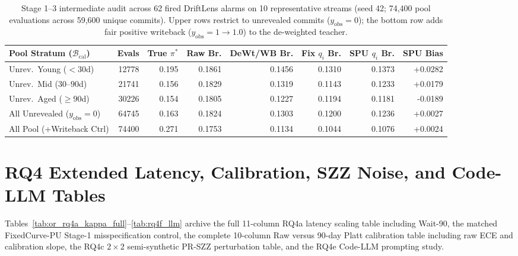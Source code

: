 \documentclass[10pt,a4paper]{article}
\begin{document}
\begin{table}[!htbp]
\centering
\caption{Stage 1--3 intermediate audit across 62 fired DriftLens alarms on 10 representative streams (seed 42; 74,400 pool evaluations across 59,600 unique commits). Upper rows restrict to unrevealed commits ($y_{\mathrm{obs}}=0$); the bottom row adds fair positive writeback ($y_{\mathrm{obs}}=1 \to 1.0$) to the de-weighted teacher.}
\label{tab:mechanism_audit}
\fontsize{7.5}{9.0}\selectfont
\setlength{\tabcolsep}{2.0pt}
\begin{tabular*}{\textwidth}{@{\extracolsep\fill}lrrrrrrr@{}}
\toprule
\textbf{Pool Stratum ($\mathcal{B}_{\mathrm{cal}}$)} & \textbf{Evals} & \textbf{True $\pi^*$} & \textbf{Raw Br.} & \textbf{DeWt/WB Br.} & \textbf{Fix $q_i$ Br.} & \textbf{SPU $q_i$ Br.} & \textbf{SPU Bias} \\
\midrule
Unrev.\ Young ($<30$d) & 12778 & 0.195 & 0.1861 & 0.1456 & 0.1310 & 0.1373 & +0.0282 \\
Unrev.\ Mid ($30$--$90$d) & 21741 & 0.156 & 0.1829 & 0.1319 & 0.1143 & 0.1233 & +0.0179 \\
Unrev.\ Aged ($\ge 90$d) & 30226 & 0.154 & 0.1805 & 0.1227 & 0.1194 & 0.1181 & -0.0189 \\
All Unrevealed ($y_{\mathrm{obs}}=0$) & 64745 & 0.163 & 0.1824 & 0.1303 & 0.1200 & 0.1236 & +0.0027 \\
\midrule
All Pool (+Writeback Ctrl) & 74400 & 0.271 & 0.1753 & 0.1134 & 0.1044 & 0.1076 & +0.0024 \\
\bottomrule
\end{tabular*}
\end{table}

\clearpage
\section{RQ4 Extended Latency, Calibration, SZZ Noise, and Code-LLM Tables}
\label{sec:or_rq4}

Tables~\ref{tab:or_rq4a_kappa_full}--\ref{tab:rq4f_llm} archive the full 11-column RQ4a latency scaling table including Wait-90, the matched FixedCurve-PU Stage-1 misspecification control, the complete 10-column Raw versus 90-day Platt calibration table including raw ECE and calibration slope, the RQ4c $2\times 2$ semi-synthetic PR-SZZ perturbation table, and the RQ4e Code-LLM prompting study.
\end{document}
